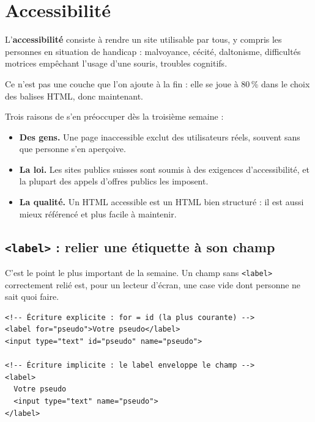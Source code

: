 \documentclass[a4paper,11pt]{article}
\begin{document}
\section{Accessibilité}

\begin{tcolorbox}[definition, title={Définition --- Accessibilité (a11y)}]
L'\textbf{accessibilité} consiste à rendre un site utilisable par tous, y compris les personnes en situation de handicap : malvoyance, cécité, daltonisme, difficultés motrices empêchant l'usage d'une souris, troubles cognitifs.

\vspace{3pt}
Ce n'est pas une couche que l'on ajoute à la fin : elle se joue à 80\,\% dans le choix des balises HTML, donc maintenant.
\end{tcolorbox}

\vspace{4pt}
\noindent Trois raisons de s'en préoccuper dès la troisième semaine :

\begin{itemize}
  \item \textbf{Des gens.} Une page inaccessible exclut des utilisateurs réels, souvent sans que personne s'en aperçoive.
  \item \textbf{La loi.} Les sites publics suisses sont soumis à des exigences d'accessibilité, et la plupart des appels d'offres publics les imposent.
  \item \textbf{La qualité.} Un HTML accessible est un HTML bien structuré : il est aussi mieux référencé et plus facile à maintenir.
\end{itemize}

\subsection{\texttt{<label>} : relier une étiquette à son champ}

C'est le point le plus important de la semaine. Un champ sans \texttt{<label>} correctement relié est, pour un lecteur d'écran, une case vide dont personne ne sait quoi faire.

\begin{lstlisting}[language=HTML5, caption={Deux écritures possibles, un seul résultat}]
<!-- Écriture explicite : for = id (la plus courante) -->
<label for="pseudo">Votre pseudo</label>
<input type="text" id="pseudo" name="pseudo">

<!-- Écriture implicite : le label enveloppe le champ -->
<label>
  Votre pseudo
  <input type="text" name="pseudo">
</label>
\end{lstlisting}
\end{document}
